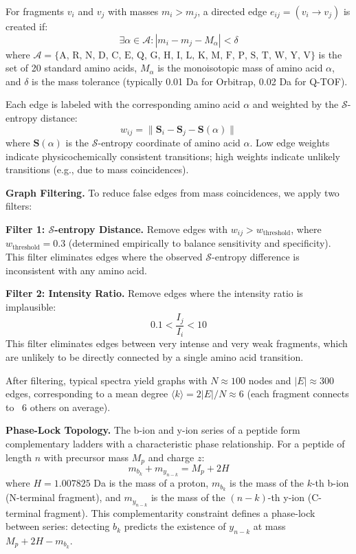 \documentclass[11pt,twocolumn]{article}
\newcommand{\sentropy}{$\mathcal{S}$-entropy}
\begin{document}
For fragments $v_i$ and $v_j$ with masses $m_i > m_j$, a directed edge $e_{ij} = (v_i \rightarrow v_j)$ is created if:
\begin{equation}
    \exists \alpha \in \mathcal{A} : |m_i - m_j - M_\alpha| < \delta
    \label{eq:edge_condition}
\end{equation}
where $\mathcal{A} = \{\text{A, R, N, D, C, E, Q, G, H, I, L, K, M, F, P, S, T, W, Y, V}\}$ is the set of 20 standard amino acids, $M_\alpha$ is the monoisotopic mass of amino acid $\alpha$, and $\delta$ is the mass tolerance (typically 0.01 Da for Orbitrap, 0.02 Da for Q-TOF).

Each edge is labeled with the corresponding amino acid $\alpha$ and weighted by the \sentropy{} distance:
\begin{equation}
    w_{ij} = \| \mathbf{S}_i - \mathbf{S}_j - \mathbf{S}(\alpha) \|
    \label{eq:edge_weight}
\end{equation}
where $\mathbf{S}(\alpha)$ is the \sentropy{} coordinate of amino acid $\alpha$. Low edge weights indicate physicochemically consistent transitions; high weights indicate unlikely transitions (e.g., due to mass coincidences).

\textbf{Graph Filtering.} To reduce false edges from mass coincidences, we apply two filters:

\textbf{Filter 1: \sentropy{} Distance.} Remove edges with $w_{ij} > w_{\text{threshold}}$, where $w_{\text{threshold}} = 0.3$ (determined empirically to balance sensitivity and specificity). This filter eliminates edges where the observed \sentropy{} difference is inconsistent with any amino acid.

\textbf{Filter 2: Intensity Ratio.} Remove edges where the intensity ratio is implausible:
\begin{equation}
    0.1 < \frac{I_j}{I_i} < 10
\end{equation}
This filter eliminates edges between very intense and very weak fragments, which are unlikely to be directly connected by a single amino acid transition.

After filtering, typical spectra yield graphs with $N \approx 100$ nodes and $|E| \approx 300$ edges, corresponding to a mean degree $\langle k \rangle = 2|E|/N \approx 6$ (each fragment connects to ~6 others on average).

\textbf{Phase-Lock Topology.} The b-ion and y-ion series of a peptide form complementary ladders with a characteristic phase relationship. For a peptide of length $n$ with precursor mass $M_p$ and charge $z$:
\begin{equation}
    m_{b_k} + m_{y_{n-k}} = M_p + 2H
    \label{eq:complementarity}
\end{equation}
where $H = 1.007825$ Da is the mass of a proton, $m_{b_k}$ is the mass of the $k$-th b-ion (N-terminal fragment), and $m_{y_{n-k}}$ is the mass of the $(n-k)$-th y-ion (C-terminal fragment). This complementarity constraint defines a phase-lock between series: detecting $b_k$ predicts the existence of $y_{n-k}$ at mass $M_p + 2H - m_{b_k}$.
\end{document}
